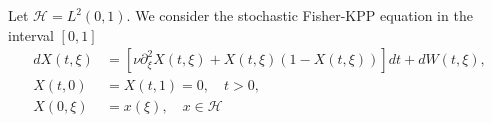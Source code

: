 Let $\mathcal{H} = L^2 (0,1)$. We consider the stochastic Fisher-KPP 
    equation in the interval $[0, 1]$
    \begin{equation}
        \label{eqn:fisher-kpp}
        \begin{aligned}
            d X(t, \xi) &= 
                \left[
                    \nu 
                    \partial_{\xi} ^ 2 X(t, \xi)
                    +
                    X(t, \xi) (1 -X(t, \xi) )
                \right]
                dt
                +
                dW(t, \xi),
            \\
            X(t, 0) &= X(t, 1) =0, \quad t>0, 
            \\
            X(0, \xi) &= x(\xi), \quad x\in \mathcal{H}
        \end{aligned}
    \end{equation}
    
